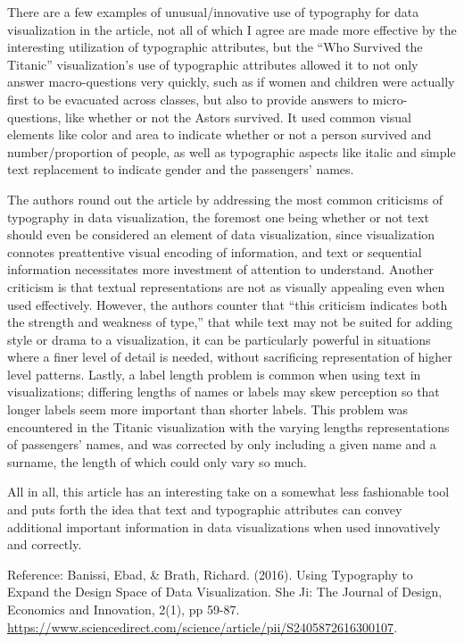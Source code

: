\documentclass[]{book}
\theoremstyle{definition}
\theoremstyle{definition}
\theoremstyle{definition}
\theoremstyle{remark}
\begin{document}
There are a few examples of unusual/innovative use of typography for
data visualization in the article, not all of which I agree are made
more effective by the interesting utilization of typographic attributes,
but the ``Who Survived the Titanic'' visualization's use of typographic
attributes allowed it to not only answer macro-questions very quickly,
such as if women and children were actually first to be evacuated across
classes, but also to provide answers to micro-questions, like whether or
not the Astors survived. It used common visual elements like color and
area to indicate whether or not a person survived and number/proportion
of people, as well as typographic aspects like italic and simple text
replacement to indicate gender and the passengers' names.

The authors round out the article by addressing the most common
criticisms of typography in data visualization, the foremost one being
whether or not text should even be considered an element of data
visualization, since visualization connotes preattentive visual encoding
of information, and text or sequential information necessitates more
investment of attention to understand. Another criticism is that textual
representations are not as visually appealing even when used
effectively. However, the authors counter that ``this criticism
indicates both the strength and weakness of type,'' that while text may
not be suited for adding style or drama to a visualization, it can be
particularly powerful in situations where a finer level of detail is
needed, without sacrificing representation of higher level patterns.
Lastly, a label length problem is common when using text in
visualizations; differing lengths of names or labels may skew perception
so that longer labels seem more important than shorter labels. This
problem was encountered in the Titanic visualization with the varying
lengths representations of passengers' names, and was corrected by only
including a given name and a surname, the length of which could only
vary so much.

All in all, this article has an interesting take on a somewhat less
fashionable tool and puts forth the idea that text and typographic
attributes can convey additional important information in data
visualizations when used innovatively and correctly.

Reference: Banissi, Ebad, \& Brath, Richard. (2016). Using Typography to
Expand the Design Space of Data Visualization. She Ji: The Journal of
Design, Economics and Innovation, 2(1), pp 59-87.
\url{https://www.sciencedirect.com/science/article/pii/S2405872616300107}.
\end{document}
